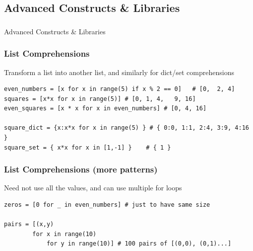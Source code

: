 \subsection{Advanced Constructs \& Libraries}
\begin{frame}[fragile]\frametitle{}
\begin{center}
{\Large Advanced Constructs \& Libraries}
\end{center}
\end{frame}

\begin{frame}[fragile]\frametitle{List Comprehensions}
Transform a list into another list, and similarly for dict/set comprehensions
  \begin{lstlisting}
even_numbers = [x for x in range(5) if x % 2 == 0]	 # [0,	2, 4]
squares = [x*x for x in range(5)] # [0, 1, 4,	9, 16]
even_squares = [x * x for x in even_numbers] # [0, 4, 16]

square_dict	= {x:x*x for x in range(5) } # { 0:0, 1:1, 2:4, 3:9, 4:16	}
square_set = { x*x for x in [1,-1] }	# { 1 }
  \end{lstlisting}
\end{frame}

\begin{frame}[fragile]\frametitle{List Comprehensions (more patterns)}
Need not use all the values, and can use multiple for loops
  \begin{lstlisting}
zeros = [0 for _ in even_numbers] # just to have same size

pairs = [(x,y)
		for x in range(10)
			for y in range(10)] # 100 pairs of [(0,0), (0,1)...]
  \end{lstlisting}
\end{frame}

